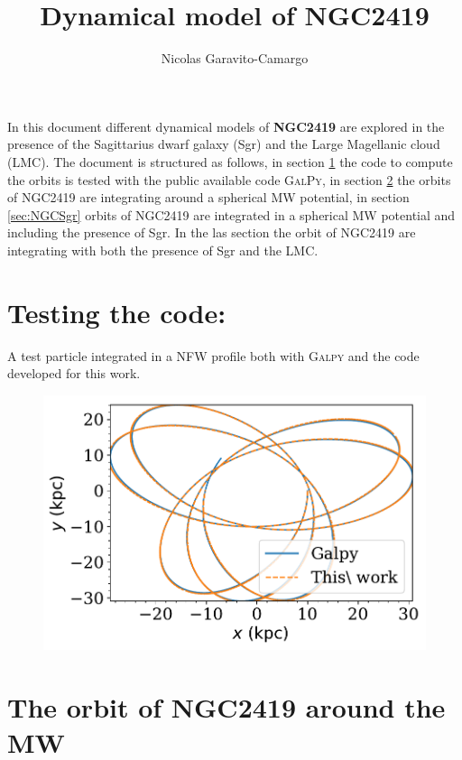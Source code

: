 \documentclass[14pt]{article}
\title{Dynamical model of NGC2419}
\author{Nicolas Garavito-Camargo}
\begin{document}
\maketitle


In this document different dynamical models of \textbf{NGC2419} are explored
in the presence of the Sagittarius dwarf galaxy (Sgr) and the Large
Magellanic cloud (LMC). The document is structured as follows, in section
\ref{sec:test} the code to compute the orbits is tested with the
public available code \textsc{GalPy}, in section \ref{sec:NGC} the
orbits of NGC2419 are integrating around a spherical MW potential,
in section \ref{sec:NGCSgr} orbits of NGC2419 are integrated in a
spherical MW potential and including the presence of Sgr.
 In the las section the orbit of NGC2419 are integrating
with both the presence of Sgr and the LMC.

\section{Testing the code:}\label{sec:test}

A test particle integrated in a NFW profile both with \textsc{Galpy}
and the code developed for this work.

\begin{figure}[H]
\centering
\includegraphics[scale=0.5]{../exploratory_code/galpy_test.pdf}
\end{figure}


\section{The orbit of NGC2419 around the MW}\label{sec:NGC}
\end{document}
